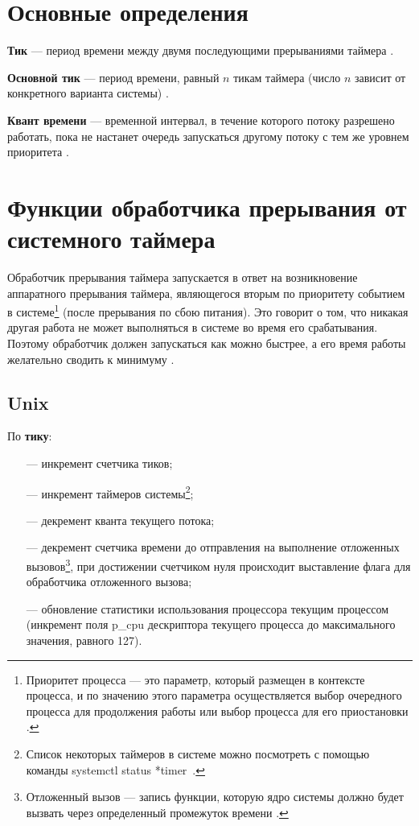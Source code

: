 \chapter{Основные определения}

\textbf{Тик} --- период времени между двумя последующими прерываниями таймера \cite{unix1}.

\textbf{Основной тик} --- период времени, равный $n$ тикам таймера (число $n$ зависит от конкретного варианта системы) \cite{unix1}.

\textbf{Квант времени} --- временной интервал, в течение которого потоку разрешено работать, пока не настанет очередь запускаться другому потоку с тем же уровнем приоритета \cite{win4}.

\chapter{Функции обработчика прерывания от системного таймера}

Обработчик прерывания таймера запускается в ответ на возникновение аппаратного прерывания таймера, являющегося вторым по приоритету событием в системе\footnote{Приоритет процесса --- это параметр, который размещен в контексте процесса, и по значению этого параметра осуществляется выбор очередного процесса для продолжения работы или выбор процесса для его приостановки \cite{plan}.} (после прерывания по сбою питания). Это говорит о том, что никакая другая работа не может выполняться в системе во время его срабатывания. Поэтому обработчик должен запускаться как можно быстрее, а его время работы желательно сводить к минимуму \cite{unix1}. 


\section{Unix}

По \textbf{тику}:

\begin{itemize}
    \item[---] инкремент счетчика тиков;
    \item[---] инкремент таймеров системы\footnote{Список некоторых таймеров в системе можно посмотреть с помощью команды {\ttfamily systemctl status *timer}~\cite{timer}.};
    \item[---] декремент кванта текущего потока;
    \item[---] декремент счетчика времени до отправления на выполнение отложенных вызовов\footnote{Отложенный вызов --- запись функции, которую ядро системы должно будет вызвать через определенный промежуток времени \cite{unix2}.}, при достижении счетчиком нуля происходит выставление флага для обработчика отложенного вызова;
    \item[---] обновление статистики использования процессора текущим процессом (инкремент поля {\ttfamily p\_cpu} дескриптора текущего процесса до максимального значения, равного 127).
\end{itemize}

